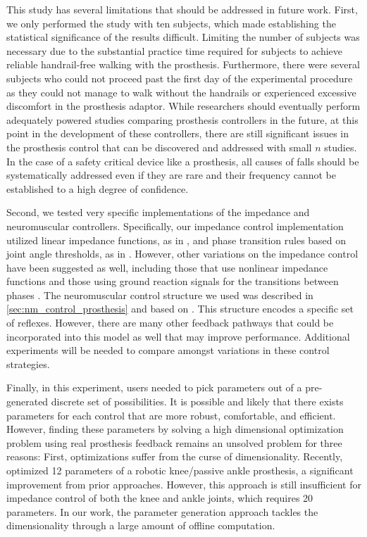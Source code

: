 This study has several limitations that should be addressed in future work.
First, we only performed the study with ten subjects, which made establishing
the statistical significance of the results difficult. Limiting the number of
subjects was necessary due to the substantial practice time required for
subjects to achieve reliable handrail-free walking with the prosthesis.
Furthermore, there were several  subjects who could not proceed
past the first day of the experimental procedure as they could not manage to
walk without the handrails or experienced excessive discomfort in the prosthesis
adaptor. While researchers should eventually perform adequately powered studies
comparing prosthesis controllers in the future, at this point in the development
of these controllers, there are still significant issues in the prosthesis
control that can be discovered and addressed with small $n$ studies. In the case
of a safety critical device like a prosthesis, all causes of falls should be
systematically addressed even if they are rare and their frequency cannot be
established to a high degree of confidence.

Second, we tested very specific implementations of the impedance and
neuromuscular controllers. Specifically, our impedance control implementation
utilized linear impedance functions, as in \citet{sup2009preliminary}, and phase
transition rules based on joint angle thresholds, as in
\citet{lawson2014robotic}. However, other variations on the impedance control
have been suggested as well, including those that use nonlinear impedance
functions \citep{sup2007design,shultz2016variable} and those using ground
reaction signals for the transitions between phases \citep{sup2009preliminary}.
The neuromuscular control structure we used was described in
\cref{sec:nm_control_prosthesis} and based on \citet{song2015neural}. This
structure encodes a specific set of reflexes. However, there are many other
feedback pathways that could be incorporated into this model as well that may
improve performance. Additional experiments will be needed to compare amongst
variations in these control strategies.

Finally, in this experiment, users needed to pick parameters out of a
pre-generated discrete set of possibilities. It is possible and likely that there
exists parameters for each control that are more robust, comfortable, and
efficient. However, finding these parameters by solving a high dimensional
optimization problem using real prosthesis feedback remains an unsolved problem
for three reasons: First, optimizations suffer from the curse of dimensionality.
Recently, \citet{wen2019online} optimized 12 parameters of a robotic
knee/passive ankle prosthesis, a significant improvement from prior approaches.
However, this approach is still insufficient for impedance control of both the
knee and ankle joints, which requires 20 parameters. In our work, the parameter
generation approach tackles the dimensionality through a large amount of offline
computation.

